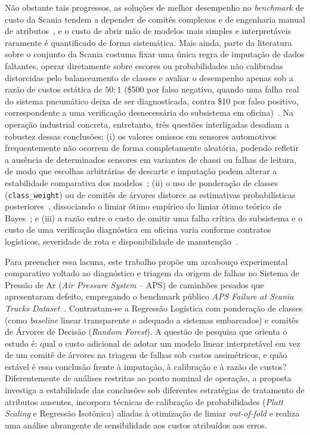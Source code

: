 \documentclass[conference]{IEEEtran}
\begin{document}
Não obstante tais progressos, as soluções de melhor desempenho no \textit{benchmark} de custo da Scania tendem a depender de comitês complexos e de engenharia manual de atributos~\cite{costa2016ida,gondek2016prediction,cerqueira2016combining}, e o custo de abrir mão de modelos mais simples e interpretáveis raramente é quantificado de forma sistemática. Mais ainda, parte da literatura sobre o conjunto da Scania costuma fixar uma única regra de imputação de dados faltantes, operar diretamente sobre escores ou probabilidades não calibradas distorcidas pelo balanceamento de classes e avaliar o desempenho apenas sob a razão de custos estática de $50:1$ (\$500 por falso negativo, quando uma falha real do sistema pneumático deixa de ser diagnosticada, contra \$10 por falso positivo, correspondente a uma verificação desnecessária do subsistema em oficina)~\cite{scania_dataset}. Na operação industrial concreta, entretanto, três questões interligadas desafiam a robustez dessas conclusões: (i) os valores omissos em sensores automotivos frequentemente não ocorrem de forma completamente aleatória, podendo refletir a ausência de determinados sensores em variantes de chassi ou falhas de leitura, de modo que escolhas arbitrárias de descarte e imputação podem alterar a estabilidade comparativa dos modelos~\cite{rafsunjani2019}; (ii) o uso de ponderação de classes (\texttt{class\_weight}) ou de comitês de árvores distorce as estimativas probabilísticas posteriores~\cite{zadrozny2002transforming,niculescu2005predicting,dalpozzolo2015calibrating}, dissociando o limiar ótimo empírico do limiar ótimo teórico de Bayes~\cite{elkan2001foundations}; e (iii) a razão entre o custo de omitir uma falha crítica do subsistema e o custo de uma verificação diagnóstica em oficina varia conforme contratos logísticos, severidade de rota e disponibilidade de manutenção~\cite{drummond2006cost,hughes2025xai}.

Para preencher essa lacuna, este trabalho propõe um arcabouço experimental comparativo voltado ao diagnóstico e triagem da origem de falhas no Sistema de Pressão de Ar (\textit{Air Pressure System} -- APS) de caminhões pesados que apresentaram defeito, empregando o benchmark público \textit{APS Failure at Scania Trucks Dataset}~\cite{scania_dataset}. Contrastam-se a Regressão Logística com ponderação de classes (como \textit{baseline} linear transparente e adequado a sistemas embarcados) e comitês de Árvores de Decisão (\textit{Random Forest}). A questão de pesquisa que orienta o estudo é: qual o custo adicional de adotar um modelo linear interpretável em vez de um comitê de árvores na triagem de falhas sob custos assimétricos, e quão estável é essa conclusão frente à imputação, à calibração e à razão de custos? Diferentemente de análises restritas ao ponto nominal de operação, a proposta investiga a estabilidade das conclusões sob diferentes estratégias de tratamento de atributos ausentes, incorpora técnicas de calibração de probabilidades (\textit{Platt Scaling} e Regressão Isotônica) aliadas à otimização de limiar \textit{out-of-fold} e realiza uma análise abrangente de sensibilidade aos custos atribuídos aos erros.
\end{document}
